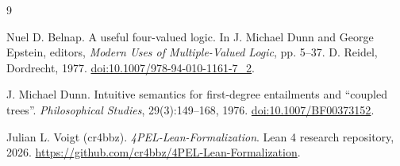 \begin{thebibliography}{9}

Nuel D. Belnap.
\newblock A useful four-valued logic.
\newblock In J. Michael Dunn and George Epstein, editors, \emph{Modern Uses of Multiple-Valued Logic}, pp. 5--37. D. Reidel, Dordrecht, 1977.
\newblock \href{https://doi.org/10.1007/978-94-010-1161-7_2}{doi:10.1007/978-94-010-1161-7\_2}.

J. Michael Dunn.
\newblock Intuitive semantics for first-degree entailments and ``coupled trees''.
\newblock \emph{Philosophical Studies}, 29(3):149--168, 1976.
\newblock \href{https://doi.org/10.1007/BF00373152}{doi:10.1007/BF00373152}.

Julian L. Voigt (cr4bbz).
\newblock \emph{4PEL-Lean-Formalization}.
\newblock Lean 4 research repository, 2026.
\newblock \url{https://github.com/cr4bbz/4PEL-Lean-Formalization}.

\end{thebibliography}

